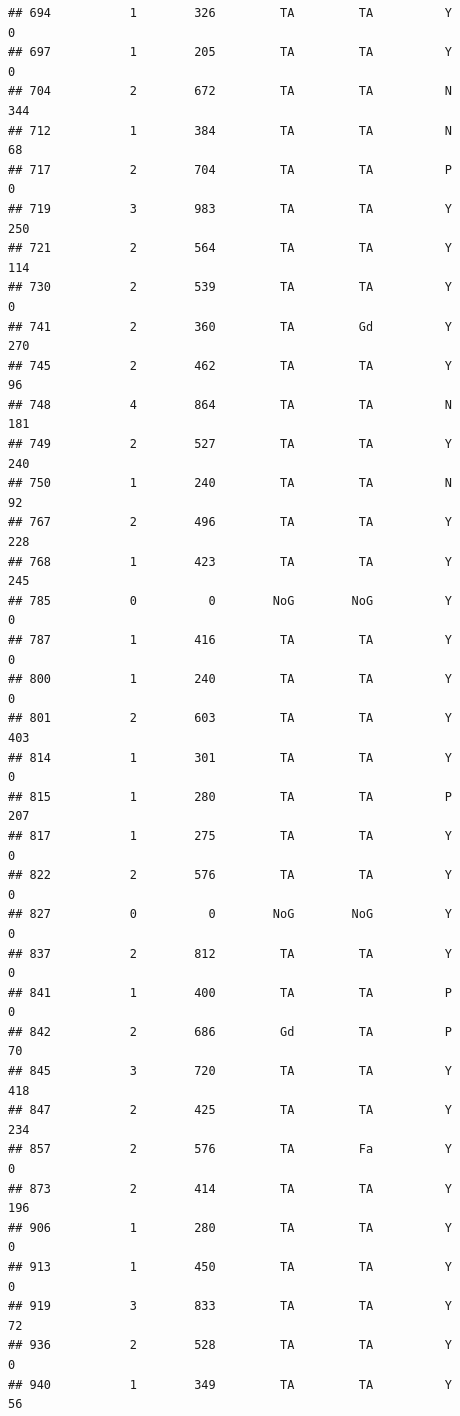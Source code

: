 \documentclass[]{article}
\begin{document}
\begin{verbatim}
## 694           1        326         TA         TA          Y          0
## 697           1        205         TA         TA          Y          0
## 704           2        672         TA         TA          N        344
## 712           1        384         TA         TA          N         68
## 717           2        704         TA         TA          P          0
## 719           3        983         TA         TA          Y        250
## 721           2        564         TA         TA          Y        114
## 730           2        539         TA         TA          Y          0
## 741           2        360         TA         Gd          Y        270
## 745           2        462         TA         TA          Y         96
## 748           4        864         TA         TA          N        181
## 749           2        527         TA         TA          Y        240
## 750           1        240         TA         TA          N         92
## 767           2        496         TA         TA          Y        228
## 768           1        423         TA         TA          Y        245
## 785           0          0        NoG        NoG          Y          0
## 787           1        416         TA         TA          Y          0
## 800           1        240         TA         TA          Y          0
## 801           2        603         TA         TA          Y        403
## 814           1        301         TA         TA          Y          0
## 815           1        280         TA         TA          P        207
## 817           1        275         TA         TA          Y          0
## 822           2        576         TA         TA          Y          0
## 827           0          0        NoG        NoG          Y          0
## 837           2        812         TA         TA          Y          0
## 841           1        400         TA         TA          P          0
## 842           2        686         Gd         TA          P         70
## 845           3        720         TA         TA          Y        418
## 847           2        425         TA         TA          Y        234
## 857           2        576         TA         Fa          Y          0
## 873           2        414         TA         TA          Y        196
## 906           1        280         TA         TA          Y          0
## 913           1        450         TA         TA          Y          0
## 919           3        833         TA         TA          Y         72
## 936           2        528         TA         TA          Y          0
## 940           1        349         TA         TA          Y         56

\end{verbatim}
\end{document}
